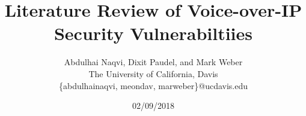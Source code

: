 \documentclass[letterpaper,twocolumn,10pt]{article}
\begin{document}
\title{ Literature Review of Voice-over-IP Security Vulnerabiltiies}
  \date{ 02/09/2018 }
  \author{Abdulhai Naqvi, Dixit Paudel, and Mark Weber\\
  The University of California, Davis\\
  \{abdulhainaqvi, meondav, marweber\}@ucdavis.edu}

\maketitle






\appendix


\end{document}
